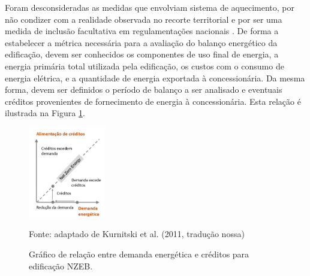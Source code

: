 \noindent Foram desconsideradas as medidas que envolviam sistema de aquecimento, por não condizer 
com a realidade observada no recorte territorial e por ser uma medida de inclusão facultativa 
em regulamentações nacionais \cite{InstitutoNacionaldeMetrologiaNormalizacaoeQualidadeIndustrial-INMETRO2018,InstitutoNacionaldeMetrologiaNormalizacaoeQualidadeIndustrial-INMETRO2018a}.
De forma a estabelecer a métrica necessária para a avaliação do balanço energético da edificação, 
devem ser conhecidos os componentes de uso final de energia, a energia primária total utilizada 
pela edificação, os custos com o consumo de energia elétrica, e a quantidade de energia 
exportada à concessionária. Da mesma forma, devem ser definidos o período de balanço a ser 
analisado e eventuais créditos provenientes de fornecimento de energia à concessionária. 
Esta relação é ilustrada na Figura \ref{fig:figura2}.\vspace*{-0.4cm}
    \begin{figure}[ht]
        \centering
        \small \caption{Gráfico de relação entre demanda energética e créditos para edificação NZEB.}
        \includegraphics[width=0.3\textwidth]{figures/esquema_iea_2014-2.png}
        \par \small Fonte: adaptado de Kurnitski et al. (2011, tradução nossa)
        \label{fig:figura2}
    \end{figure}